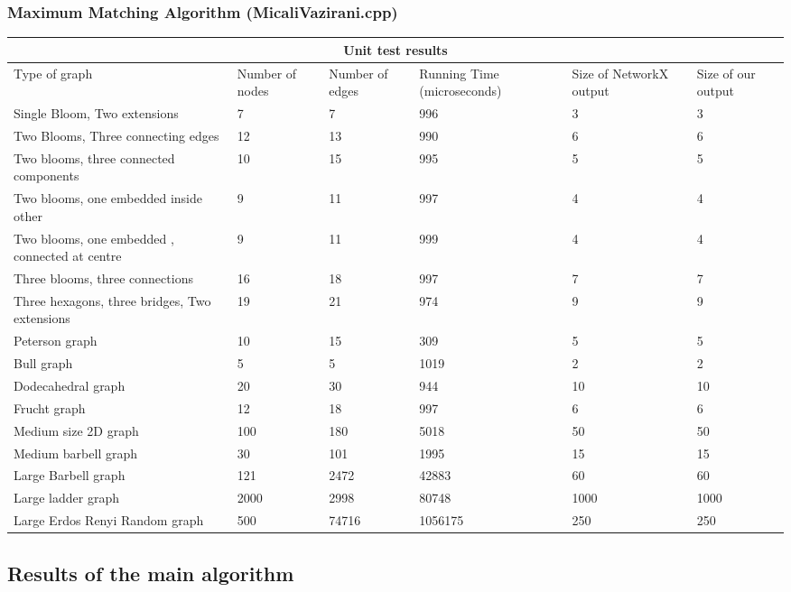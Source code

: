 \documentclass[12pt, a4paper]{article}
\begin{document}
\subsubsection{Maximum Matching Algorithm (MicaliVazirani.cpp)}
{\renewcommand{\arraystretch}{2}
\begin{longtable}{ |p{2cm}||p{2cm}|p{2cm}|p{2cm}|p{2cm}| p{2cm}|  }
 \hline
 \multicolumn{6}{|c|}{Unit test results} \\
 \hline
Type of graph & Number of nodes &Number of edges & Running Time (microseconds) & Size of NetworkX output & Size of our output\\
 \hline
Single Bloom, Two extensions   & 7   &7& 996&3&3  \\\hline
Two Blooms, Three connecting edges   & 12   &13& 990&6&6  \\\hline
Two blooms, three connected components   & 10   &15& 995&5&5  \\\hline
Two blooms, one embedded inside other   & 9   &11& 997&4&4  \\\hline
Two blooms, one embedded , connected at centre &9&11&999&4&4 \\\hline
Three blooms, three connections   & 16   &18& 997&7&7  \\\hline
Three hexagons, three bridges, Two extensions   &19  &21& 974&9&9  \\\hline
Peterson graph & 10  &15& 309&5&5  \\\hline
Bull graph   & 5   &5& 1019&2&2  \\\hline
Dodecahedral graph   &20  &30 & 944 &10&10  \\\hline
Frucht graph   &12   &18 & 997 &6&6  \\\hline
Medium size 2D graph   & 100   &180& 5018&50&50  \\\hline
Medium barbell graph   & 30   &101& 1995&15&15  \\\hline
Large Barbell graph   &121   &2472& 42883&60&60  \\\hline
Large ladder graph   & 2000   &2998& 80748&1000&1000  \\\hline
Large Erdos Renyi Random graph &500 &74716& 1056175&250&250 \\\hline

 \hline
\end{longtable}

\subsection{Results of the main algorithm}

}
\end{document}
